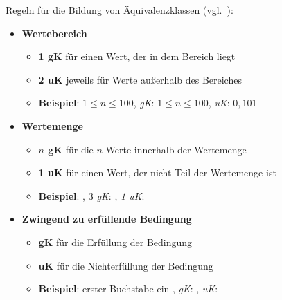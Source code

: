 \begin{tcolorbox}[title=Äquivalenzklassen]
    \noindent
    Regeln für die Bildung von Äquivalenzklassen (vgl.~\cite[52 ff.]{Lig09b}):
    \begin{itemize}
        \item[] \textbf{Wertebereich}
        \begin{itemize}
            \item \textbf{1 gK} für einen Wert, der in dem Bereich liegt
            \item \textbf{2 uK} jeweils für Werte außerhalb des Bereiches
            \item \textbf{Beispiel}: $1 \leq n  \leq 100$, \textit{gK}: $1 \leq n  \leq 100$, \textit{uK}: $0, 101$
        \end{itemize}
        \item[] \textbf{Wertemenge}
        \begin{itemize}
            \item \textbf{$n$ gK} für die $n$ Werte innerhalb der Wertemenge
            \item \textbf{1 uK} für einen Wert, der nicht Teil der Wertemenge ist
            \item \textbf{Beispiel}: \code{[A, D, F]}, \textit{$3$ gK}: , \textit{1 uK}: 
        \end{itemize}
        \item[] \textbf{Zwingend zu erfüllende Bedingung}
        \begin{itemize}
            \item \textbf{gK} für die Erfüllung der Bedingung
            \item \textbf{uK} für die Nichterfüllung der Bedingung
            \item \textbf{Beispiel}: erster Buchstabe ein , \textit{gK}: , \textit{uK}: 
        \end{itemize}
    \end{itemize}
\end{tcolorbox}